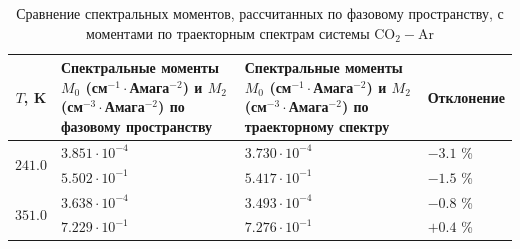 \begin{table}[H]
    \caption{Сравнение спектральных моментов, рассчитанных по фазовому пространству, с моментами по траекторным спектрам системы CO$_2-$Ar}
    \begin{tabular}{c >{\centering}p{6cm} >{\centering}p{6cm} >{\centering}p{3cm}}
        \toprule
        $T$, K & Спектральные моменты $M_0$ (см$^{-1} \cdot$Амага$^{-2}$) и $M_2$ (см$^{-3} \cdot$Амага$^{-2}$) по фазовому пространству & Спектральные моменты $M_0$ (см$^{-1} \cdot$Амага$^{-2}$) и $M_2$ (см$^{-3} \cdot$Амага$^{-2}$) по траекторному спектру & Отклонение \tabularnewline
        \midrule
        \multirow{2}{*}{$241.0$} & $3.851 \cdot 10^{-4}$ & $3.730 \cdot 10^{-4}$ & $-3.1$ \%  \tabularnewline
                                 & $5.502 \cdot 10^{-1}$ & $5.417 \cdot 10^{-1}$ & $-1.5$ \%  \tabularnewline
        \midrule
        \multirow{2}{*}{$351.0$} & $3.638 \cdot 10^{-4}$ & $3.493 \cdot 10^{-4}$ & $-0.8$ \%  \tabularnewline
                                 & $7.229 \cdot 10^{-1}$ & $7.276 \cdot 10^{-1}$ & $+0.4$ \%  \tabularnewline
        \bottomrule
    \end{tabular}
    \label{table:co2ar-moments}
\end{table}

